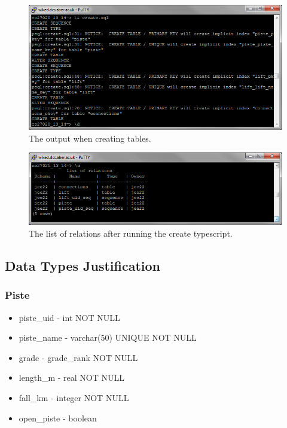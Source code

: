 \documentclass[11pt]{scrartcl} %
\begin{document}
\begin{figure}[H]
  \centering
    \includegraphics[width=1\textwidth]{IMG/create_tables.png}
 \caption{The output when creating tables.}
\end{figure}
\begin{figure}[H]
  \centering
    \includegraphics[width=1\textwidth]{IMG/completed_tables.png}
 \caption{The list of relations after running the create typescript.}
\end{figure}

\subsection{Data Types Justification}
\subsubsection{Piste}
\begin{itemize}
\item piste\_uid - int NOT NULL
\item piste\_name - varchar(50) UNIQUE NOT NULL 
\item grade - grade\_rank NOT NULL
\item length\_m - real NOT NULL
\item fall\_km - integer NOT NULL
\item open\_piste - boolean
\end{itemize}
\end{document}
